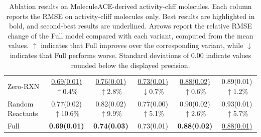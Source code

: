 \begin{table}[t]
{\begin{tabular}{l*{5}{c}}
Zero-RXN
& \shortstack{\underline{0.69(0.01)}\\$\uparrow$0.4\%}
& \shortstack{\underline{0.76(0.01)}\\$\uparrow$2.8\%}
& \shortstack{\underline{0.73(0.01)}\\$\downarrow$0.7\%}
& \shortstack{\underline{0.88(0.02)}\\$\uparrow$0.6\%}
& \shortstack{0.89(0.01)\\$\uparrow$1.2\%} \\

Random Reactants
& \shortstack{0.77(0.02)\\$\uparrow$10.6\%}
& \shortstack{0.82(0.02)\\$\uparrow$9.9\%}
& \shortstack{0.77(0.00)\\$\uparrow$5.1\%}
& \shortstack{0.90(0.02)\\$\uparrow$2.6\%}
& \shortstack{0.93(0.01)\\$\uparrow$5.7\%} \\

Full
& \textbf{0.69(0.01)}
& \textbf{0.74(0.03)}
& 0.73(0.01)
& \textbf{0.88(0.02)}
& \underline{0.88(0.01)} \\

\hline
\end{tabular}
}
\caption{Ablation results on MoleculeACE-derived activity-cliff molecules. Each column reports the RMSE on activity-cliff molecules only. Best results are highlighted in bold, and second-best results are underlined. Arrows report the relative RMSE change of the Full model compared with each variant, computed from the mean values. $\uparrow$ indicates that Full improves over the corresponding variant, while $\downarrow$ indicates that Full performs worse. Standard deviations of \(0.00\) indicate values rounded below the displayed precision.}
\label{tab:clif_ablation}
\end{table}
